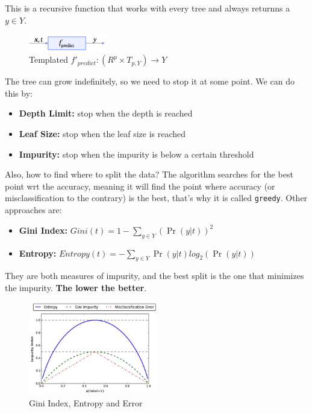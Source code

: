 \vspace{-1em}

This is a recursive function that works with every tree and always returnns a $y \in Y$.

\begin{figure}[H]
    \centering
    \includegraphics[width=0.3\textwidth]{assets/fig13.png}
    \caption{Templated $f'_{predict} : (R^p \times T_{p,Y}) \to Y$}
\end{figure}

\begin{warningblock}
    The tree can grow indefinitely, so we need to stop it at some point. We can do this by:
    \begin{itemize}
        \item \textbf{Depth Limit:} stop when the depth is reached
        \item \textbf{Leaf Size:} stop when the leaf size is reached
        \item \textbf{Impurity:} stop when the impurity is below a certain threshold
    \end{itemize}
\end{warningblock}

Also, how to find where to split the data? The algorithm searches for the best point wrt the accuracy, meaning it will find the point where accuracy (or misclassification to the contrary) is the best, that's why it is called \texttt{greedy}. Other approaches are:
\begin{itemize}
    \item \textbf{Gini Index:} $Gini(t) = 1 - \sum_{y \in Y}^{}(\Pr(y|t))^2$
    \item \textbf{Entropy:} $Entropy(t) = -\sum_{y \in Y}^{}\Pr(y|t)log_2(\Pr(y|t))$
\end{itemize}

They are both measures of impurity, and the best split is the one that minimizes the impurity. \textbf{The lower the better}.

\vspace{-1em}

\begin{center}
    \begin{figure}[H]
        \centering
        \includegraphics[width=0.5\textwidth]{assets/fig14.png}
        \caption{Gini Index, Entropy and Error}
    \end{figure}
\end{center}

